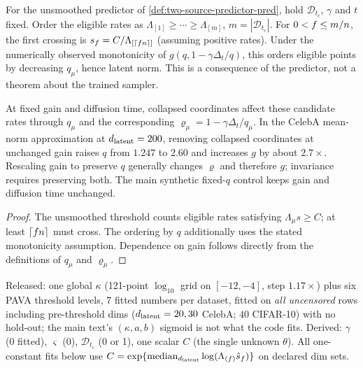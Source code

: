\begin{corollary}\label{cor:shape-from-qmu-pred}
For the unsmoothed predictor of \cref{def:two-source-predictor-pred}, hold $\mathcal D_{t_c}$, $\gamma$ and $t$ fixed. Order the eligible rates as $\Lambda_{[1]}\ge\cdots\ge\Lambda_{[m]}$, $m=|\mathcal D_{t_c}|$. For $0<f\le m/n$, the first crossing is $s_f=C/\Lambda_{[\lceil fn\rceil]}$ (assuming positive rates). Under the numerically observed monotonicity of $g(q,1-\gamma\Delta_t/q)$, this orders eligible points by decreasing $q_\mu$, hence latent norm. This is a consequence of the predictor, not a theorem about the trained sampler.

At fixed gain and diffusion time, collapsed coordinates affect these candidate rates through $q_\mu$ and the corresponding $\varrho_\mu=1-\gamma\Delta_t/q_\mu$. In the CelebA mean-norm approximation at $d_{\mathrm{latent}}=200$, removing collapsed coordinates at unchanged gain raises $q$ from $1.247$ to $2.60$ and increases $g$ by about $2.7\times$. Rescaling gain to preserve $q$ generally changes $\varrho$ and therefore $g$; invariance requires preserving both. The main synthetic fixed-$q$ control keeps gain and diffusion time unchanged.
\end{corollary}
\begin{proof}
The unsmoothed threshold counts eligible rates satisfying $\Lambda_\mu s\ge C$; at least $\lceil fn\rceil$ must cross. The ordering by $q$ additionally uses the stated monotonicity assumption. Dependence on gain follows directly from the definitions of $q_\mu$ and $\varrho_\mu$.
\end{proof}

\begin{remark}\label{rem:param-count-pred}
Released: one global $\kappa$ (121-point $\log_{10}$ grid on $[-12,-4]$, step $1.17\times$) plus six PAVA threshold levels, 7 fitted numbers per dataset, fitted on \emph{all uncensored} rows including pre-threshold dims ($d_{\mathrm{latent}}=20,30$ CelebA; $40$ CIFAR-10) with no hold-out; the main text's $(\kappa,a,b)$ sigmoid is not what the code fits. Derived: $\gamma$ (0 fitted), $\varsigma$ (0), $\mathcal D_{t_c}$ (0 or 1), one scalar $C$ (the single unknown $\theta$). All one-constant fits below use $C=\exp\{\mathrm{median}_{d_{\mathrm{latent}}}\log(\Lambda_{(f)}\hat s_f)\}$ on declared dim sets.
\end{remark}

